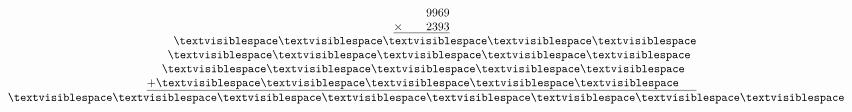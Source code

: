 \begin{minipage}[t]{0.3\linewidth}
\begin{align*}\begin{array}{c}
\phantom{
\times0000
}
9969\\
\underline{
\times
\phantom{
0000
}
2393
}\\
\phantom{
+000
}
\textvisiblespace
\textvisiblespace
\textvisiblespace
\textvisiblespace
\textvisiblespace
\\
\phantom{
+00
}
\textvisiblespace
\textvisiblespace
\textvisiblespace
\textvisiblespace
\textvisiblespace
\phantom0\\
\phantom{
+0
}
\textvisiblespace
\textvisiblespace
\textvisiblespace
\textvisiblespace
\textvisiblespace
\phantom0\phantom0\\
\underline{
+
\textvisiblespace
\textvisiblespace
\textvisiblespace
\textvisiblespace
\textvisiblespace
\phantom0\phantom0\phantom0
}
\\
\phantom{+}
\textvisiblespace
\textvisiblespace
\textvisiblespace
\textvisiblespace
\textvisiblespace
\textvisiblespace
\textvisiblespace
\textvisiblespace
\end{array}\end{align*}
\end{minipage}
\begin{minipage}[t]{0.05\linewidth}
\begin{align*}\begin{array}{c}
\textvisiblespace
\\
\textvisiblespace
\\
\textvisiblespace
\\
\textvisiblespace
\\
\textvisiblespace
\\
\textvisiblespace
\\
\textvisiblespace
\end{array}\end{align*}
\end{minipage}
\begin{minipage}[t]{0.05\linewidth}
\begin{align*}\begin{array}{c}
\textvisiblespace
\\
\textvisiblespace
\\
\textvisiblespace
\\
\textvisiblespace
\\
\textvisiblespace
\\
\textvisiblespace
\\
\textvisiblespace
\end{array}\end{align*}
\end{minipage}
